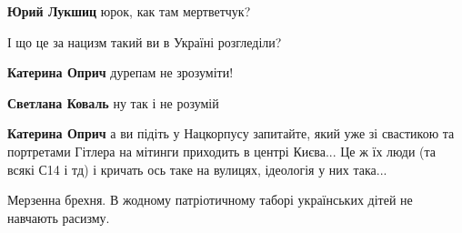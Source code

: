 \begin{itemize}
\begin{itemize}
 
\textbf{Юрий Лукшиц} юрок, как там мертветчук?

 
І що це за нацизм такий ви в Україні розгледіли?

 
\textbf{Катерина Оприч} дурепам не зрозуміти!

 
\textbf{Светлана Коваль} ну так і не розумій

 
\textbf{Катерина Оприч} а ви підіть у Нацкорпусу запитайте, який уже зі свастикою та портретами Гітлера на мітинги приходить в центрі Києва... Це ж їх люди (та всякі С14 і тд) і кричать ось таке на вулицях, ідеологія у них така...

 
Мерзенна брехня. В жодному патріотичному таборі українських дітей не навчають расизму.

 

\end{itemize}
\end{itemize}
